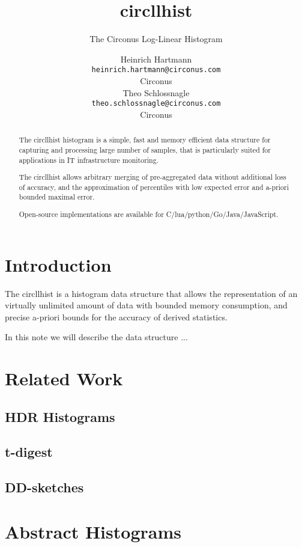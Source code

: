 \documentclass{article}
\title{circllhist}
\subtitle{The Circonus Log-Linear Histogram}
\author{
  Heinrich Hartmann \\
  \texttt{heinrich.hartmann@circonus.com} \\
  Circonus \\
  \And
  Theo Schlossnagle \\
  \texttt{theo.schlossnagle@circonus.com} \\
  Circonus
}
\theoremstyle{plain}
\theoremstyle{remark}
\begin{document}
\maketitle

\begin{abstract}
  The circllhist histogram is a simple, fast and memory efficient data structure for capturing
  and processing large number of samples, that is particularly suited for applications in
  IT infrastructure monitoring.

  The circllhist allows arbitrary merging of pre-aggregated data without additional loss of accuracy,
  and the approximation of percentiles with low expected error and a-priori bounded maximal error.

  Open-source implementations are available for C/lua/python/Go/Java/JavaScript.
\end{abstract}

\tableofcontents

\section{Introduction}
The circllhist is a histogram data structure that allows the representation of an virtually
unlimited amount of data with bounded memory consumption, and precise a-priori bounds for the
accuracy of derived statistics.

In this note we will describe the data structure ...

\section{Related Work}

\subsection{HDR Histograms}

\subsection{t-digest}

\subsection{DD-sketches}

\section{Abstract Histograms}
\end{document}
